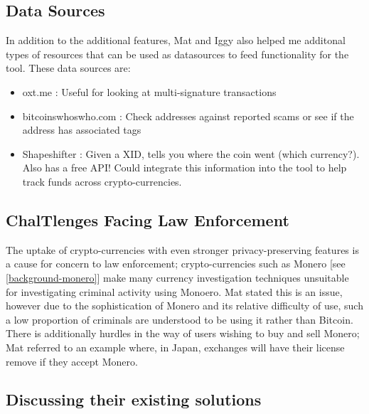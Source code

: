 \subsection{Data Sources}
In addition to the additional features, Mat and Iggy also helped me additonal types of resources that can be used as datasources to feed functionality for the tool. These data sources are:
\begin{itemize}
    \item oxt.me : Useful for looking at multi-signature transactions
    \item bitcoinswhoswho.com : Check addresses against reported scams or see if the address has associated tags
    \item Shapeshifter : Given a 
XID, tells you where the coin went (which currency?). Also has a free API! Could integrate this information into the tool to help track funds across crypto-currencies. \end{itemize}



\subsection{ChalTlenges Facing Law Enforcement}
The uptake of crypto-currencies with even stronger privacy-preserving features is a cause for concern to law enforcement; crypto-currencies such as Monero [see \ref{background-monero}] make many currency investigation techniques unsuitable for investigating criminal activity using Monoero. Mat stated this is an issue, however due to the sophistication of Monero and its relative difficulty of use, such a low proportion of criminals are understood to be using it rather than Bitcoin. There is additionally hurdles in the way of users wishing to buy and sell Monero; Mat referred to an example where, in Japan, exchanges will have their license remove if they accept Monero.

\subsection{Discussing their existing solutions}
